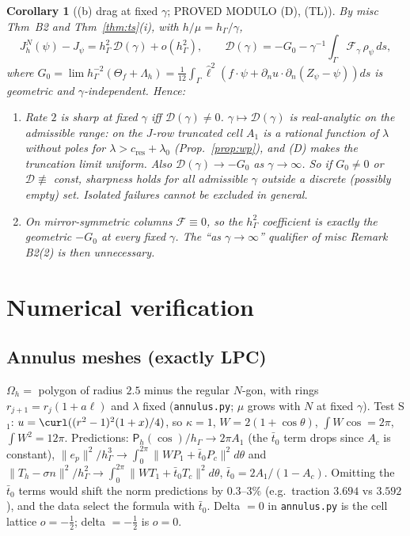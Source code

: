 \documentclass[11pt,reqno]{amsart}
\theoremstyle{plain}
\newtheorem{corollary}[theorem]{Corollary}
\theoremstyle{definition}
\newcommand{\hG}{h_\Gamma}
\newcommand{\Oh}{\Omega_h}
\newcommand{\norm}[1]{\lVert #1\rVert}
\newcommand{\Pm}{\mathsf P_h}
\newcommand{\cc}{c_{\mathrm{res}}}
\begin{document}
\begin{corollary}[(b) drag at fixed $\gamma$; PROVED MODULO (D), (TL)]\label{cor:b}
By misc Thm~B2 and Thm~\ref{thm:ts}(i), with $h/\mu=\hG/\gamma$,
\[
J^N_h(\psi)-J_\psi=\hG^2\,\mathcal D(\gamma)+o(\hG^2),\qquad \mathcal D(\gamma)=-G_0-\gamma^{-1}\int_\Gamma\mathcal F_\gamma\,\rho_\psi\,ds,
\]
where $G_0=\lim\hG^{-2}(\Theta_f+\Lambda_h)=\frac1{12}\int_\Gamma\hat\ell^2(f\cdot\psi+\partial_nu\cdot\partial_n(Z_\psi-\psi))ds$ is geometric and $\gamma$-independent. Hence:
\begin{enumerate}
\item Rate $2$ is sharp at fixed $\gamma$ iff $\mathcal D(\gamma)\ne0$. $\gamma\mapsto\mathcal D(\gamma)$ is real-analytic on the admissible range: on the $J$-row truncated cell $A_1$ is a rational function of $\lambda$ without poles for $\lambda>\cc+\lambda_0$ (Prop.~\ref{prop:wp}), and (D) makes the truncation limit uniform. Also $\mathcal D(\gamma)\to-G_0$ as $\gamma\to\infty$. So if $G_0\ne0$ or $\mathcal D\not\equiv$ const, sharpness holds for all admissible $\gamma$ outside a discrete (possibly empty) set. Isolated failures cannot be excluded in general.
\item On mirror-symmetric columns $\mathcal F\equiv0$, so the $\hG^2$ coefficient is exactly the geometric $-G_0$ at every fixed $\gamma$. The ``as $\gamma\to\infty$'' qualifier of misc Remark B2(2) is then unnecessary.
\end{enumerate}
\end{corollary}

\section{Numerical verification}

\subsection{Annulus meshes (exactly LPC)}
$\Oh=$ polygon of radius $2.5$ minus the regular $N$-gon, with rings $r_{j+1}=r_j(1+a\ell)$ and $\lambda$ fixed (\texttt{annulus.py}; $\mu$ grows with $N$ at fixed $\gamma$). Test S$_1$: $u=\curl((r^2-1)^2(1+x)/4)$, so $\kappa=1$, $W=2(1+\cos\theta)$, $\int W\cos=2\pi$, $\int W^2=12\pi$. Predictions: $\Pm(\cos)/\hG\to2\pi A_1$ (the $\bar t_0$ term drops since $A_c$ is constant), $\norm{e_p}^2/\hG^3\to\int_0^{2\pi}\norm{WP_1+\bar t_0P_c}^2d\theta$ and $\norm{T_h-\sigma n}^2/\hG^2\to\int_0^{2\pi}\norm{WT_1+\bar t_0T_c}^2d\theta$, $\bar t_0=2A_1/(1-A_c)$. Omitting the $\bar t_0$ terms would shift the norm predictions by $0.3$--$3\%$ (e.g.\ traction $3.694$ vs $3.592$), and the data select the formula with $\bar t_0$. Delta $=0$ in \texttt{annulus.py} is the cell lattice $o=-\frac12$; delta $=-\frac12$ is $o=0$.
\end{document}
